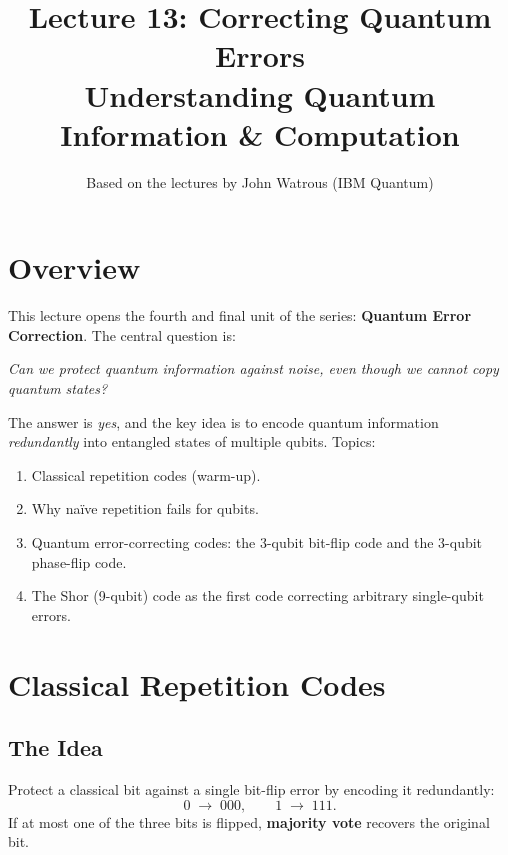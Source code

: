\documentclass[11pt]{article}
\title{\textbf{Lecture 13: Correcting Quantum Errors} \\ \large Understanding Quantum Information \& Computation}
\author{Based on the lectures by John Watrous (IBM Quantum)}
\date{}
\theoremstyle{definition}
\begin{document}
\maketitle
\tableofcontents
\newpage

\section{Overview}

This lecture opens the fourth and final unit of the series: \textbf{Quantum Error Correction}.  The central question is:

\begin{center}
\emph{Can we protect quantum information against noise, even though we cannot copy quantum states?}
\end{center}

The answer is \emph{yes}, and the key idea is to encode quantum information \emph{redundantly} into entangled states of multiple qubits.  Topics:

\begin{enumerate}
    \item Classical repetition codes (warm-up).
    \item Why na\"ive repetition fails for qubits.
    \item Quantum error-correcting codes: the 3-qubit bit-flip code and the 3-qubit phase-flip code.
    \item The Shor (9-qubit) code as the first code correcting arbitrary single-qubit errors.
\end{enumerate}

\section{Classical Repetition Codes}

\subsection{The Idea}

Protect a classical bit against a single bit-flip error by encoding it redundantly:
\[
    0 \;\longrightarrow\; 000, \qquad 1\;\longrightarrow\; 111.
\]
If at most one of the three bits is flipped, \textbf{majority vote} recovers the original bit.
\end{document}

